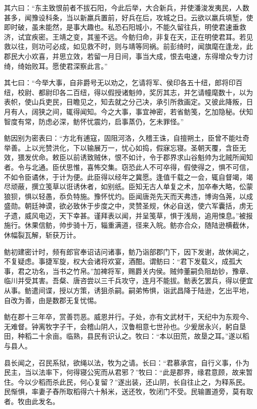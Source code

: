 \documentclass[12pt,UTF8]{ctexbook}
\begin{document}
其六曰：“东主致恨前者不拔石阳，今此后举，大合新兵，并使潘浚发夷民，人数甚多，闻豫设科条，当以新羸兵置前，好兵在后，攻城之日。云欲以羸兵填堑，使即时破，虽未能然，是事大趣也。私恐石阳城小，不能久留往兵，明使君速垂救济，试宜疾密。王靖之变，其鉴不远。今鲂归命，非复在天，正在明使君耳。若见救以往，则功可必成，如见救不时，则与靖等同祸。前彭绮时，闻旗麾在逢龙，此郡民大小欢喜，并思立效，若留一月日间，事当大成，恨去电速，东得增众专力讨绮，绮始败耳。愿使君深察此言。”

其七曰：“今举大事，自非爵号无以劝之，乞请将军、侯印各五十纽，郎将印百纽，校尉、都尉印各二百纽，得以假授诸魁帅，奖厉其志，并乞请幢麾数十，以为表帜，使山兵吏民，目瞻见之，知去就之分己决，承引所救画定。又彼此降叛，日月有人，阔狭之间，辄得闻知。今之大事，事宜神密，若省鲂笺，乞加隐秘。伏知智度有常，防虑必深，鲂怀忧震灼，启事蒸仍，乞未罪怪。”

鲂因别为密表曰：“方北有逋寇，固阻河洛，久稽王诛，自擅朔土，臣曾不能吐奇举善。上以光赞洪化，下以输展万一，忧心如捣，假寐忘寝。圣朝天覆，含臣无效，猥发优命。敕臣以前诱致贼休，恨不如计，令于郡界求山谷魁帅为北贼所闻知者。令与北通。臣伏思惟，喜怖交集。窃恐此人不可卒得，假使得之，惧不可信，不如令臣谲休，于计为便。此臣得以经年之冀愿。逢值千载之一会，辄自督竭，竭尽顽蔽，撰立笺草以诳诱休者，如别纸。臣知无古人单复之术，加卒奉大略，伀蒙狼狈，惧以轻愚，忝负特施。豫怀忧灼。臣闻唐尧先天而天弗违，博询刍荛，以成盛勋。朝廷神谟，欲必致休于步度之中，灵赞圣规，休必自送，使六军囊括，虏无孑遗，威风电迈，天下幸甚。谨拜表以闻，并呈笺草，惧于浅局，追用悚息。”被报施行。休果信鲂，帅步骑十万，辎重满道，径来入皖。鲂亦合众，随陆逊横截休，休幅裂瓦解，斩获万计。

鲂初建密计时，频有郎官奉诏诘问诸事，鲂乃诣部郡门下，因下发谢，故休闻之，不复疑虑。事捷军旋，权大会诸将欢宴，酒酣。谓鲂曰：“君下发载义，成孤大事，君之功名，当书之竹帛。”加裨将军，赐爵关内侯。贼帅董嗣负阻劫钞，豫章、临川并受其害。吾粲、唐咨尝以三千兵攻守，连月不能拔。鲂表乞罢兵，得以便宜从事。鲂遣间谍，授以方策，诱狙杀嗣。嗣弟怖惧，诣武昌降于陆逊，乞出平地，自改为善，由是数郡无复忧惕。

鲂在郡十三年卒，赏善罚恶。威恩并行。子处，亦有文武材干，天纪中为东观今、无难督。钟离牧字子干，会稽山阴人，汉鲁相意七世孙也。少爰居永兴，躬自垦田，种稻二十余亩。临熟，县民有识认之。牧曰：“本以田荒，故垦之耳。”遂以稻与县人。

县长闻之，召民系狱，欲绳以法，牧为之请。长曰：“君慕承宫，自行义事，仆为民主，当以法率下，何得寝公宪而从君邪？”牧曰：“此是郡界，缘君意顾，故来暂住。今以少稻而杀此民，何心复留？”遂出装，还山阴，长自往止之，为释系民。民惭惧，率妻子舂所取稻得六十斛米，送还牧，牧闭门不受。民输置道旁，莫有取者。牧由此发名。
\end{document}
